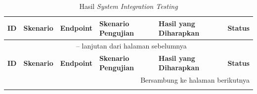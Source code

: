 \begin{longtable}{p{1.3cm} p{1.6cm} p{3cm} p{4.3cm} p{3cm} p{1.5cm}}
\caption{Hasil \textit{System Integration Testing}} \label{tab:integration-testing} \\

\hline
\textbf{ID} & \textbf{Skenario} & \textbf{Endpoint} & \textbf{Skenario Pengujian} & \textbf{Hasil yang Diharapkan} & \textbf{Status} \\ \hline
\endfirsthead

\multicolumn{6}{c}{\tablename\ \thetable{} -- lanjutan dari halaman sebelumnya} \\ \hline
\textbf{ID} & \textbf{Skenario} & \textbf{Endpoint} & \textbf{Skenario Pengujian} & \textbf{Hasil yang Diharapkan} & \textbf{Status} \\ \hline
\endhead

\hline \multicolumn{6}{r}{Bersambung ke halaman berikutnya} \\
\endfoot

\hline
\endlastfoot


\end{longtable}
